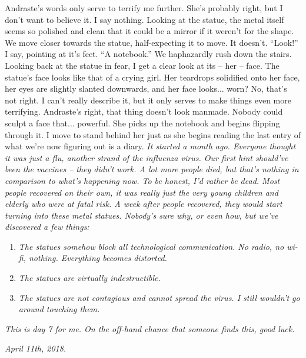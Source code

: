 \documentclass[a4paper, 12pt]{book}
\newcommand\tab[1][1cm]{\hspace*{#1}}
\begin{document}
\newline
\tab
Andraste’s words only serve to terrify me further. She’s probably right, but I don’t want to believe it. I say nothing. Looking at the statue, the metal itself seems so polished and clean that it could be a mirror if it weren’t for the shape.
\newline
\tab
We move closer towards the statue, half-expecting it to move. It doesn’t. ``Look!'' I say, pointing at it’s feet. ``A notebook.'' We haphazardly rush down the stairs. Looking back at the statue in fear, I get a clear look at its -- her -- face. The statue’s face looks like that of a crying girl. Her teardrops solidified onto her face, her eyes are slightly slanted downwards, and her face looks... worn? No, that’s not right. I can’t really describe it, but it only serves to make things even more terrifying. Andraste’s right, that thing doesn’t look manmade. Nobody could sculpt a face that... powerful.
\newline
\tab
She picks up the notebook and begins flipping through it. I move to stand behind her just as she begins reading the last entry of what we’re now figuring out is a diary.
\newline
\tab
\textit{
It started a month ago. Everyone thought it was just a flu, another strand of the influenza virus. Our first hint should’ve been the vaccines -- they didn’t work. A lot more people died, but that’s nothing in comparison to what’s happening now. To be honest, I’d rather be dead. Most people recovered on their own, it was really just the very young children and elderly who were at fatal risk. A week after people recovered, they would start turning into these metal statues. Nobody’s sure why, or even how, but we’ve discovered a few things:
}
\begin{enumerate}
\item \textit{The statues somehow block all technological communication. No radio, no wi-fi, nothing. Everything becomes distorted.}
\item \textit{The statues are virtually indestructible.}
\item \textit{The statues are not contagious and cannot spread the virus. I still wouldn’t go around touching them.}
\end{enumerate}
\tab
\textit{This is day 7 for me. On the off-hand chance that someone finds this, good luck.}
\newline
\tab
\begin{center}
\textit{April 11th, 2018.}
\end{center}
\end{document}
